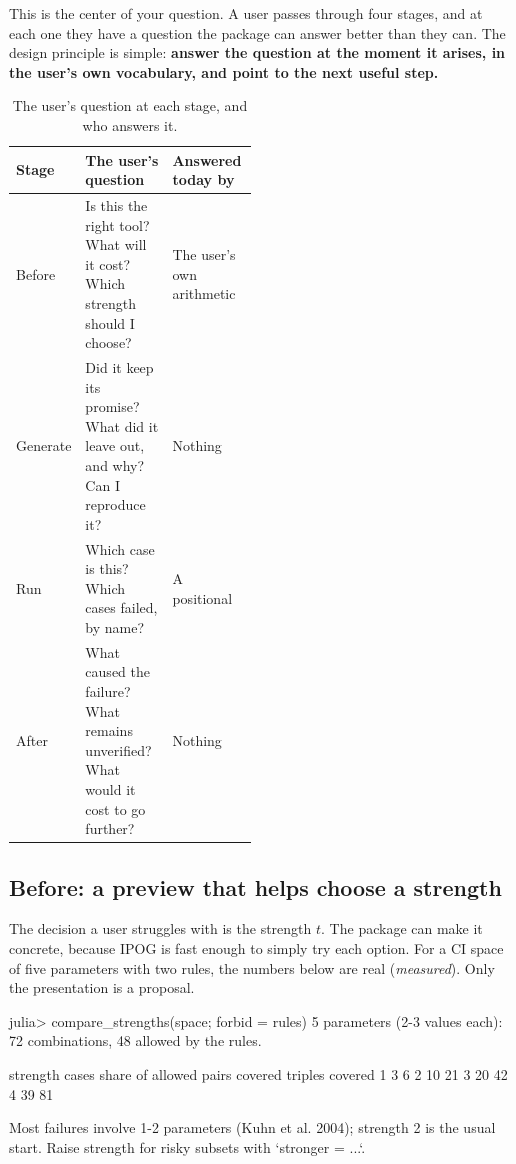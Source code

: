 \documentclass[11pt]{article}
\newcommand{\code}[1]{\texttt{\detokenize{#1}}}
\begin{document}
This is the center of your question. A user passes through four stages, and
at each one they have a question the package can answer better than they
can. The design principle is simple: \textbf{answer the question at the
moment it arises, in the user's own vocabulary, and point to the next useful
step.}

\begin{table}[h]
\centering\small
\caption{The user's question at each stage, and who answers it.}\label{tab:stages}
\begin{tabularx}{\linewidth}{@{}L{0.12\linewidth} L{0.36\linewidth} Y@{}}
\toprule
Stage & The user's question & Answered today by \\
\midrule
Before & Is this the right tool? What will it cost? Which strength should I choose? & The user's own arithmetic \\
Generate & Did it keep its promise? What did it leave out, and why? Can I reproduce it? & Nothing \\
Run & Which case is this? Which cases failed, by name? & A positional \code{Vector{Any}} \\
After & What caused the failure? What remains unverified? What would it cost to go further? & Nothing \\
\bottomrule
\end{tabularx}
\end{table}

\subsection{Before: a preview that helps choose a strength}

The decision a user struggles with is the strength $t$. The package can make
it concrete, because IPOG is fast enough to simply try each option. For a CI
space of five parameters with two rules, the numbers below are real
(\emph{measured}). Only the presentation is a proposal.

\begin{term}
julia> compare_strengths(space; forbid = rules)
5 parameters (2-3 values each): 72 combinations, 48 allowed by the rules.

 strength  cases  share of allowed  pairs covered  triples covered
    1        3          6%
    2       10         21%
    3       20         42%
    4       39         81%

Most failures involve 1-2 parameters (Kuhn et al. 2004); strength 2 is
the usual start. Raise strength for risky subsets with `stronger = ...`.
\end{term}
\end{document}
